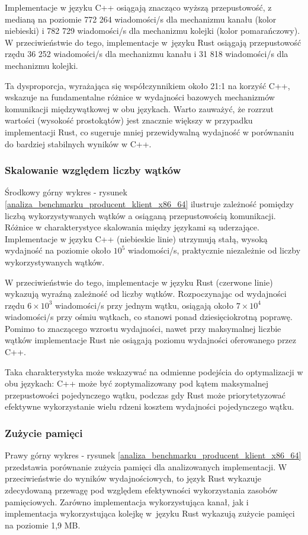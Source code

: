 Implementacje w języku C++ osiągają znacząco wyższą przepustowość, z medianą na poziomie 772 264 wiadomości/s dla mechanizmu kanału (kolor niebieski) i 782 729 wiadomości/s dla mechanizmu kolejki (kolor pomarańczowy). W przeciwieństwie do tego, implementacje w~języku Rust osiągają przepustowość rzędu 36 252 wiadomości/s dla mechanizmu kanału i 31 818 wiadomości/s dla mechanizmu kolejki.

Ta dysproporcja, wyrażająca się współczynnikiem około 21:1 na korzyść C++, wskazuje na fundamentalne różnice w wydajności bazowych mechanizmów komunikacji międzywątkowej w obu językach. Warto zauważyć, że rozrzut wartości (wysokość prostokątów) jest znacznie większy w przypadku implementacji Rust, co sugeruje mniej przewidywalną wydajność w porównaniu do bardziej stabilnych wyników w C++.

\subsubsection{Skalowanie względem liczby wątków}
Środkowy górny wykres - rysunek \ref{analiza_benchmarku_producent_klient_x86_64} ilustruje zależność pomiędzy liczbą wykorzystywanych wątków a osiąganą przepustowością komunikacji. Różnice w charakterystyce skalowania między językami są uderzające. Implementacje w języku C++ (niebieskie linie) utrzymują stałą, wysoką wydajność na poziomie około $10^5$ wiadomości/s, praktycznie niezależnie od liczby wykorzystywanych wątków.

W przeciwieństwie do tego, implementacje w języku Rust (czerwone linie) wykazują wyraźną zależność od liczby wątków. Rozpoczynając od wydajności rzędu $6\times10^3$ wiadomości/s przy jednym wątku, osiągają około $7\times10^4$ wiadomości/s przy ośmiu wątkach, co stanowi ponad dziesięciokrotną poprawę. Pomimo to znaczącego wzrostu wydajności, nawet przy maksymalnej liczbie wątków implementacje Rust nie osiągają poziomu wydajności oferowanego przez C++.

Taka charakterystyka może wskazywać na odmienne podejścia do optymalizacji w obu językach: C++ może być zoptymalizowany pod kątem maksymalnej przepustowości pojedynczego wątku, podczas gdy Rust może priorytetyzować efektywne wykorzystanie wielu rdzeni kosztem wydajności pojedynczego wątku.


\subsubsection{Zużycie pamięci}
Prawy górny wykres - rysunek \ref{analiza_benchmarku_producent_klient_x86_64} przedstawia porównanie zużycia pamięci dla analizowanych implementacji. W przeciwieństwie do wyników wydajnościowych, to język Rust wykazuje zdecydowaną przewagę pod względem efektywności wykorzystania zasobów pamięciowych. Zarówno implementacja wykorzystująca kanał, jak i implementacja wykorzystująca kolejkę w~języku Rust wykazują zużycie pamięci na poziomie 1,9 MB.

